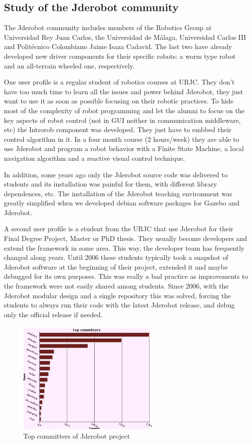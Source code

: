 \documentclass[twocolumn]{svjour3}          %
\begin{document}
\subsection{Study of the Jderobot community}
The Jderobot community includes members of the Robotics Group at Universidad Rey Juan Carlos, the Universidad de Málaga, Universidad Carlos III and Politécnico Colombiano Jaime Isaza Cadavid. The last two have already developed new driver components for their specific robots: a worm type robot and an all-terrain wheeled one, respectively.

One user profile is a regular student of robotics courses at URJC. They don't have too much time to learn all the issues and power behind Jderobot, they just want to use it as soon as possible focusing on their robotic practices. To hide most of the complexity of robot programming and let the alumni to focus on the key aspects of robot control (not in GUI neither in communication middleware, etc) the Introrob component was developed. They just have to embbed their control algorithm in it. In a four month course (2 hours/week) they are able to use Jderobot and program a robot behavior with a Finite State Machine, a local navigation algorithm and a reactive visual control technique. 

In addition, some years ago only the Jderobot source code was delivered to students and its installation was painful for them, with different library dependences, etc. The installation of the Jderobot teaching environment was greatly simplified when we developed debian software packages for Gazebo and Jderobot.

A second user profile is a student from the URJC that use Jderobot for their Final Degree Project, Master or PhD thesis. They usually become developers and extend the framework in some area. This way, the developer team has frequently changed along years. Until 2006 these students typically took a snapshot of Jderobot software at the beginning of their project, extended it and maybe debugged for its own purposes. This was really a bad practice as improvements to the framework were not easily shared among students. Since 2006, with the Jderobot modular design and a single repository this was solved, forcing the students to always run their code with the latest Jderobot release, and debug only the official release if needed.

\begin{figure}
  \includegraphics[width=7cm]{figs/svn_top-committers.png}
\caption{Top committers of Jderobot project}
\label{fig:svn-topcommiters}
\end{figure}
\end{document}
